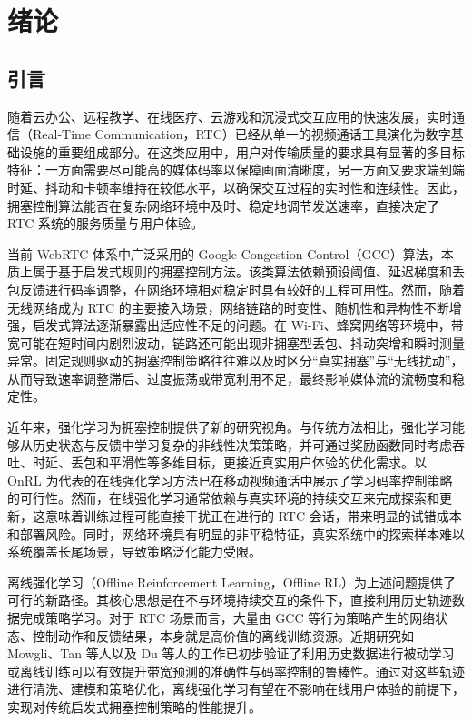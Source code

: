 
\chapter{绪论}

\section{引言}
随着云办公、远程教学、在线医疗、云游戏和沉浸式交互应用的快速发展，实时通信（Real-Time Communication，RTC）已经从单一的视频通话工具演化为数字基础设施的重要组成部分。在这类应用中，用户对传输质量的要求具有显著的多目标特征：一方面需要尽可能高的媒体码率以保障画面清晰度，另一方面又要求端到端时延、抖动和卡顿率维持在较低水平，以确保交互过程的实时性和连续性\cite{Wang2024Pudica}。因此，拥塞控制算法能否在复杂网络环境中及时、稳定地调节发送速率，直接决定了 RTC 系统的服务质量与用户体验。
\par 当前 WebRTC 体系中广泛采用的 Google Congestion Control（GCC）算法\cite{Carlucci2016GCC}，本质上属于基于启发式规则的拥塞控制方法。该类算法依赖预设阈值、延迟梯度和丢包反馈进行码率调整，在网络环境相对稳定时具有较好的工程可用性。然而，随着无线网络成为 RTC 的主要接入场景，网络链路的时变性、随机性和异构性不断增强，启发式算法逐渐暴露出适应性不足的问题\cite{Zhang2020WebRTCGCC}。在 Wi-Fi、蜂窝网络等环境中，带宽可能在短时间内剧烈波动，链路还可能出现非拥塞型丢包、抖动突增和瞬时测量异常。固定规则驱动的拥塞控制策略往往难以及时区分“真实拥塞”与“无线扰动”，从而导致速率调整滞后、过度振荡或带宽利用不足，最终影响媒体流的流畅度和稳定性。
\par 近年来，强化学习为拥塞控制提供了新的研究视角。与传统方法相比，强化学习能够从历史状态与反馈中学习复杂的非线性决策策略，并可通过奖励函数同时考虑吞吐、时延、丢包和平滑性等多维目标，更接近真实用户体验的优化需求\cite{Bentaleb2023BoB}。以 OnRL\cite{Zhang2020OnRL} 为代表的在线强化学习方法已在移动视频通话中展示了学习码率控制策略的可行性。然而，在线强化学习通常依赖与真实环境的持续交互来完成探索和更新，这意味着训练过程可能直接干扰正在进行的 RTC 会话，带来明显的试错成本和部署风险\cite{Zhang2021Loki}。同时，网络环境具有明显的非平稳特征，真实系统中的探索样本难以系统覆盖长尾场景，导致策略泛化能力受限。
\par 离线强化学习（Offline Reinforcement Learning，Offline RL）为上述问题提供了可行的新路径。其核心思想是在不与环境持续交互的条件下，直接利用历史轨迹数据完成策略学习。对于 RTC 场景而言，大量由 GCC 等行为策略产生的网络状态、控制动作和反馈结果，本身就是高价值的离线训练资源。近期研究如 Mowgli\cite{Agarwal2025Mowgli}、Tan 等人\cite{Tan2024Accurate}以及 Du 等人\cite{Du2025LLLS}的工作已初步验证了利用历史数据进行被动学习或离线训练可以有效提升带宽预测的准确性与码率控制的鲁棒性。通过对这些轨迹进行清洗、建模和策略优化，离线强化学习有望在不影响在线用户体验的前提下，实现对传统启发式拥塞控制策略的性能提升。
